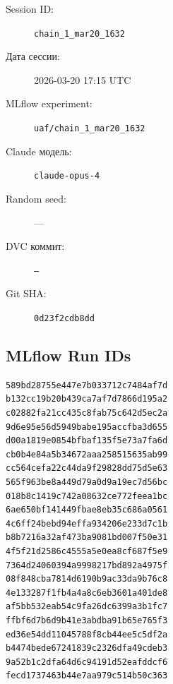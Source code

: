 \documentclass[12pt,a4paper]{article}
\begin{document}
\begin{description}
    \item[Session ID:] \texttt{chain\_1\_mar20\_1632}
    \item[Дата сессии:] 2026-03-20 17:15 UTC
    \item[MLflow experiment:] \texttt{uaf/chain\_1\_mar20\_1632}
    \item[Claude модель:] \texttt{claude-opus-4}
    \item[Random seed:] ---
    \item[DVC коммит:] \texttt{---}
    \item[Git SHA:] \texttt{0d23f2cdb8dd}
\end{description}

\subsection*{MLflow Run IDs}

\begin{lstlisting}
589bd28755e447e7b033712c7484af7d
b132cc19b20b439ca7af7d7866d195a2
c02882fa21cc435c8fab75c642d5ec2a
9d6e95e56d5949babe195accfba3d655
d00a1819e0854bfbaf135f5e73a7fa6d
cb0b4e84a5b34672aaa258515635ab99
cc564cefa22c44da9f29828dd75d5e63
565f963be8a449d79a0d9a19ec7d56bc
018b8c1419c742a08632ce772feea1bc
6ae650bf141449fbae8eb35c686a0561
4c6ff24bebd94effa934206e233d7c1b
b8b7216a32af473ba9081bd007f50e31
4f5f21d2586c4555a5e0ea8cf687f5e9
7364d24060394a9998217bd892a4975f
08f848cba7814d6190b9ac33da9b76c8
4e133287f1fb4a4a8c6eb3601a401de8
af5bb532eab54c9fa26dc6399a3b1fc7
ffbf6d7b6d9b41e3abdba91b65e765f3
ed36e54dd11045788f8cb44ee5c5df2a
b4474bede67241839c2326dfa49cdeb3
9a52b1c2dfa64d6c94191d52eafddcf6
fecd1737463b44e7aa979c514b50c363
\end{lstlisting}
\end{document}
